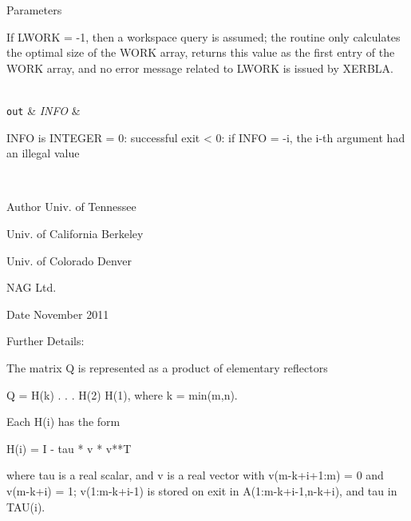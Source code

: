 \begin{DoxyParams}[1]{Parameters}
\begin{DoxyVerb}
          If LWORK = -1, then a workspace query is assumed; the routine
          only calculates the optimal size of the WORK array, returns
          this value as the first entry of the WORK array, and no error
          message related to LWORK is issued by XERBLA.\end{DoxyVerb}
\\
\hline
\mbox{\tt out}  & {\em I\+N\+F\+O} & \begin{DoxyVerb}          INFO is INTEGER
          = 0:  successful exit
          < 0:  if INFO = -i, the i-th argument had an illegal value\end{DoxyVerb}
 \\
\hline
\end{DoxyParams}
\begin{DoxyAuthor}{Author}
Univ. of Tennessee 

Univ. of California Berkeley 

Univ. of Colorado Denver 

N\+A\+G Ltd. 
\end{DoxyAuthor}
\begin{DoxyDate}{Date}
November 2011 
\end{DoxyDate}
\begin{DoxyParagraph}{Further Details\+: }
\begin{DoxyVerb}  The matrix Q is represented as a product of elementary reflectors

     Q = H(k) . . . H(2) H(1), where k = min(m,n).

  Each H(i) has the form

     H(i) = I - tau * v * v**T

  where tau is a real scalar, and v is a real vector with
  v(m-k+i+1:m) = 0 and v(m-k+i) = 1; v(1:m-k+i-1) is stored on exit in
  A(1:m-k+i-1,n-k+i), and tau in TAU(i).\end{DoxyVerb}
 
\end{DoxyParagraph}
\hypertarget{group__doubleGEcomputational_ga1b0500f49e03d2771b797c6e88adabbb}{}
